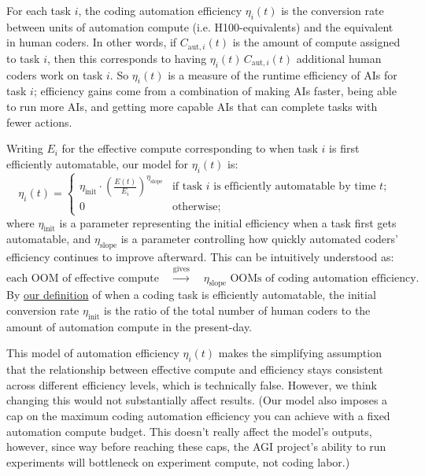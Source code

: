 \documentclass{article}
\theoremstyle{definition}
\begin{document}
For each task $i$, the coding automation efficiency $\eta_i(t)$ is the conversion rate between units of automation compute (i.e. H100-equivalents) and the equivalent in human coders. In other words, if $C_{\text{aut}, i}(t)$ is the amount of compute assigned to task $i$, then this corresponds to having $\eta_i(t) \, C_{\text{aut}, i}(t)$ additional human coders work on task $i$. So $\eta_i(t)$ is a measure of the runtime efficiency of AIs for task $i$; efficiency gains come from a combination of making AIs faster, being able to run more AIs, and getting more capable AIs that can complete tasks with fewer actions.


Writing $E_i$ for the effective compute corresponding to when task $i$ is first efficiently automatable, our model for $\eta_i(t)$ is:
\[ \eta_i(t) = \begin{cases} \eta_{\text{init}} \cdot \left(\frac{E(t)}{E_i}\right)^{\eta_{\text{slope}}} & \text{if task $i$ is efficiently automatable by time $t$;}\\ 0 & \text{otherwise;} \end{cases}\]
where $\eta_{\text{init}}$ is a parameter representing the initial efficiency when a task first gets automatable, and $\eta_{\text{slope}}$ is a parameter controlling how quickly automated coders’ efficiency continues to improve afterward. This can be intuitively understood as:
\[ \text{each OOM of effective compute} \quad \xrightarrow{\text{gives}} \quad \text{$\eta_{\text{slope}}$ OOMs of coding automation efficiency.}\]
By \hyperref[When is a task considered efficiently automatable?]{our definition} of when a coding task is efficiently automatable, the initial conversion rate $\eta_{\text{init}}$ is the ratio of the total number of human coders to the amount of automation compute in the present-day.

This model of automation efficiency $\eta_i(t)$ makes the simplifying assumption that the relationship between effective compute and efficiency stays consistent across different efficiency levels, which is technically false. However, we think changing this would not substantially affect results. (Our model also imposes a cap on the maximum coding automation efficiency you can achieve with a fixed automation compute budget. This doesn't really affect the model's outputs, however, since way before reaching these caps, the AGI project's ability to run experiments will bottleneck on experiment compute, not coding labor.)
\end{document}
